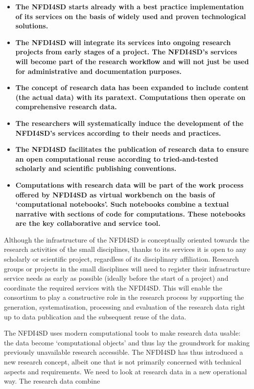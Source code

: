 \documentclass[
  english,
  paper=a4,
  oneside,captions=tableheading
]{scrbook}
\begin{document}
\begin{itemize}
\item
  \textbf{The NFDI4SD starts already with a best practice implementation
  of its services on the basis of widely used and proven technological
  solutions.}
\item
  \textbf{The NFDI4SD will integrate its services into ongoing research
  projects from early stages of a project. The NFDI4SD's services will
  become part of the research workflow and will not just be used for
  administrative and documentation purposes.}
\item
  \textbf{The concept of research data has been expanded to include
  content (the actual data) with its paratext. Computations then operate
  on comprehensive research data.}
\item
  \textbf{The researchers will systematically induce the development of
  the NFDI4SD's services according to their needs and practices.}
\item
  \textbf{The NFDI4SD facilitates the publication of research data to
  ensure an open computational reuse according to tried-and-tested
  scholarly and scientific publishing conventions.}
\item
  \textbf{Computations with research data will be part of the work
  process offered by NFDI4SD as virtual workbench on the basis of
  `computational notebooks'. Such notebooks combine a textual narrative
  with sections of code for computations. These notebooks are the key
  collaborative and service tool.}
\end{itemize}

Although the infrastructure of the NFDI4SD is conceptually oriented
towards the research activities of the small disciplines, thanks to its
services it is open to any scholarly or scientific project, regardless
of its disciplinary affiliation. Research groups or projects in the
small disciplines will need to register their infrastructure service
needs as early as possible (ideally before the start of a project) and
coordinate the required services with the NFDI4SD. This will enable the
consortium to play a constructive role in the research process by
supporting the generation, systematisation, processing and evaluation of
the research data right up to data publication and the subsequent reuse
of the data.

The NFDI4SD uses modern computational tools to make research data
usable: the data become `computational objects' and thus lay the
groundwork for making previously unavailable research accessible. The
NFDI4SD has thus introduced a new research concept, albeit one that is
not primarily concerned with technical aspects and requirements. We need
to look at research data in a new operational way. The research data
combine
\end{document}
